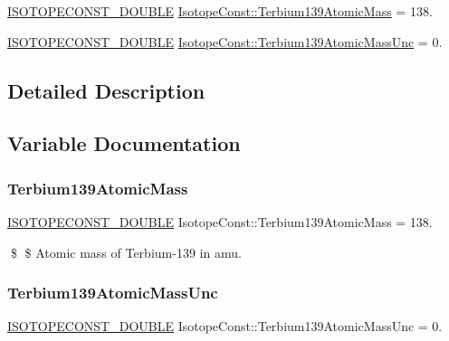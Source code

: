 \begin{DoxyCompactItemize}
\item 
\mbox{\hyperlink{group___isotope_const-_macros_ga8f45a7272ce02c0b4c65c44636ed719a}{I\+S\+O\+T\+O\+P\+E\+C\+O\+N\+S\+T\+\_\+\+D\+O\+U\+B\+LE}} \mbox{\hyperlink{group___isotope_const-_terbium-_tb139_gabc5a409f8cb7ac4af81e7dd21f7e5728}{Isotope\+Const\+::\+Terbium139\+Atomic\+Mass}} = 138.
\item 
\mbox{\hyperlink{group___isotope_const-_macros_ga8f45a7272ce02c0b4c65c44636ed719a}{I\+S\+O\+T\+O\+P\+E\+C\+O\+N\+S\+T\+\_\+\+D\+O\+U\+B\+LE}} \mbox{\hyperlink{group___isotope_const-_terbium-_tb139_ga1521dc520ff332673a7e6860d49d0fb4}{Isotope\+Const\+::\+Terbium139\+Atomic\+Mass\+Unc}} = 0.
\end{DoxyCompactItemize}


\subsection{Detailed Description}


\subsection{Variable Documentation}
\mbox{\label{group___isotope_const-_terbium-_tb139_gabc5a409f8cb7ac4af81e7dd21f7e5728}} 
\subsubsection{\texorpdfstring{Terbium139\+Atomic\+Mass}{Terbium139AtomicMass}}
{\footnotesize\ttfamily \mbox{\hyperlink{group___isotope_const-_macros_ga8f45a7272ce02c0b4c65c44636ed719a}{I\+S\+O\+T\+O\+P\+E\+C\+O\+N\+S\+T\+\_\+\+D\+O\+U\+B\+LE}} Isotope\+Const\+::\+Terbium139\+Atomic\+Mass = 138.}

\$ \$ Atomic mass of Terbium-\/139 in amu. \mbox{\label{group___isotope_const-_terbium-_tb139_ga1521dc520ff332673a7e6860d49d0fb4}} 
\subsubsection{\texorpdfstring{Terbium139\+Atomic\+Mass\+Unc}{Terbium139AtomicMassUnc}}
{\footnotesize\ttfamily \mbox{\hyperlink{group___isotope_const-_macros_ga8f45a7272ce02c0b4c65c44636ed719a}{I\+S\+O\+T\+O\+P\+E\+C\+O\+N\+S\+T\+\_\+\+D\+O\+U\+B\+LE}} Isotope\+Const\+::\+Terbium139\+Atomic\+Mass\+Unc = 0.}

